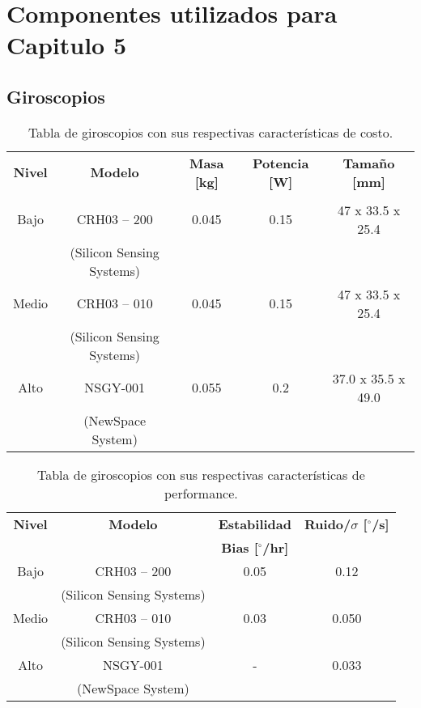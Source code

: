 \section{Componentes utilizados para Capitulo 5}

\label{ap:Z7}

\subsection{Giroscopios}

\begin{table}[h!]
	\centering
	\caption{Tabla de giroscopios con sus respectivas características de costo.}
	\begin{tabular}{|c|c|c|c|c|}
		\hline
		\textbf{Nivel} & \textbf{Modelo} & \textbf{Masa [kg]} & \textbf{Potencia [W]} & \textbf{Tamaño [mm]}  \\
		& &  &  &   \\ \hline
		Bajo & CRH03 -- 200 & 0.045 & 0.15 & 47 x 33.5 x 25.4 \\
		& (Silicon Sensing Systems) &  &  &  \\ \hline
		Medio & CRH03 -- 010 & 0.045 & 0.15 & 47 x 33.5 x 25.4  \\
		& (Silicon Sensing Systems) & &  &  \\ \hline
		Alto & NSGY-001 & 0.055 & 0.2 & 37.0 x 35.5 x 49.0  \\
		 & (NewSpace System) & &  &   \\ \hline
	\end{tabular}

\end{table}

\begin{table}[h!]
	\centering
	\caption{Tabla de giroscopios con sus respectivas características de performance.}
	\begin{tabular}{|c|c|c|c|}
		\hline
		\textbf{Nivel} & \textbf{Modelo}  & \textbf{Estabilidad} & \textbf{Ruido/$\sigma$ [$^\circ$/s]} \\
		& & \textbf{Bias [$^\circ$/hr]} &  \\ \hline
		Bajo & CRH03 -- 200 & 0.05 & 0.12 \\
		& (Silicon Sensing Systems) &  &   \\ \hline
		Medio & CRH03 -- 010 &  0.03 & 0.050 \\
		& (Silicon Sensing Systems)  &  & \\ \hline
		Alto & NSGY-001 & - & 0.033 \\
		& (NewSpace System) & &   \\ \hline
	\end{tabular}
	
\end{table}

